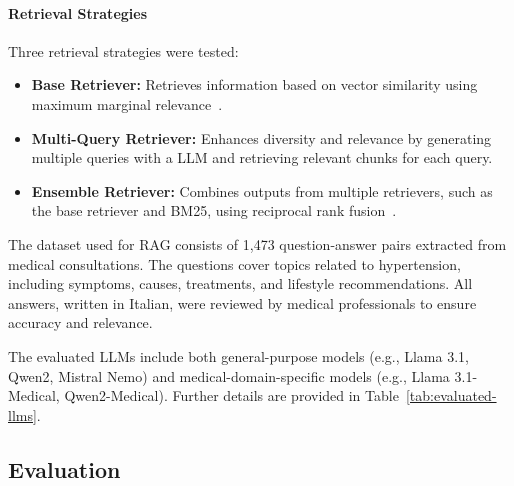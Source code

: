 \paragraph{Retrieval Strategies}
Three retrieval strategies were tested:
%
\begin{itemize}
    \item \textbf{Base Retriever:} Retrieves information based on vector similarity using maximum marginal relevance~\cite{PLACEHOLDER5}.
    \item \textbf{Multi-Query Retriever:} Enhances diversity and relevance by generating multiple queries with a \gls{LLM} and retrieving relevant chunks for each query.
    \item \textbf{Ensemble Retriever:} Combines outputs from multiple retrievers, such as the base retriever and BM25, using reciprocal rank fusion~\cite{PLACEHOLDER6}.
\end{itemize}

The dataset used for \gls{RAG} consists of 1,473 question-answer pairs extracted from medical consultations.
%
The questions cover topics related to hypertension, including symptoms, causes, treatments, and lifestyle recommendations.
%
All answers, written in Italian, were reviewed by medical professionals to ensure accuracy and relevance.

The evaluated \glspl{LLM} include both general-purpose models (e.g., Llama 3.1, Qwen2, Mistral Nemo) and medical-domain-specific models (e.g., Llama 3.1-Medical, Qwen2-Medical).
%
Further details are provided in Table~\ref{tab:evaluated-llms}.


\subsection{Evaluation}
\label{subsec:evaluation-rag}

